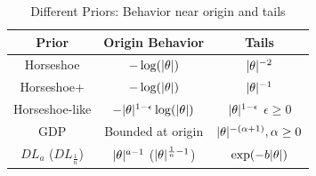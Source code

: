 \documentclass[sts,preprint]{imsart}
\begin{document}
\begin{table}%
\centering
\begin{tabular}{| c | c |c |}
\hline
Prior & Origin Behavior & Tails \\
\hline 
Horseshoe & $-\log(\lvert\theta\rvert)$ & $\lvert\theta\rvert^{-2}$ \\
Horseshoe+ & $-\log(\lvert\theta\rvert)$ & $\lvert\theta\rvert^{-1}$ \\
Horseshoe-like & $-\lvert\theta\rvert^{1-\epsilon}\log(\lvert\theta\rvert)$ & $\lvert\theta\rvert^{1-\epsilon}$ $\epsilon \ge 0$\\
GDP & Bounded at origin & $\lvert\theta\rvert^{-(\alpha + 1)}, \alpha \ge 0$ \\
$DL_{a}$ ($DL_{\frac{1}{n}}$) & $\lvert\theta\rvert^{a-1}$ ($\lvert\theta\rvert^{\frac{1}{n}-1}$) & $\exp(-b\lvert\theta\rvert)$ \\
\hline
\end{tabular}
\caption{Different Priors: Behavior near origin and tails}
\label{tab:priors}
\end{table}
\end{document}
